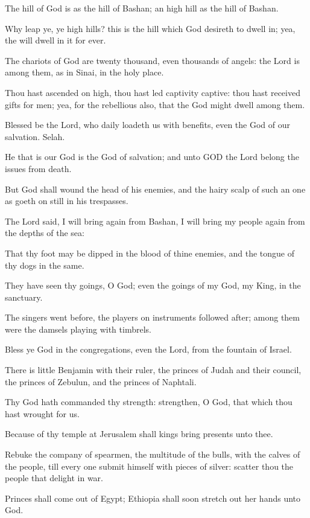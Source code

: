 \verse The hill of God is as the hill of Bashan; an high hill as the hill of Bashan.

\verse Why leap ye, ye high hills? this is the hill which God desireth to dwell in; yea, the \LORD will dwell in it for ever.

\verse The chariots of God are twenty thousand, even thousands of angels: the Lord is among them, as in Sinai, in the holy place.

\verse Thou hast ascended on high, thou hast led captivity captive: thou hast received gifts for men; yea, for the rebellious also, that the \LORD God might dwell among them.

\verse Blessed be the Lord, who daily loadeth us with benefits, even the God of our salvation. Selah.

\verse He that is our God is the God of salvation; and unto GOD the Lord belong the issues from death.

\verse But God shall wound the head of his enemies, and the hairy scalp of such an one as goeth on still in his trespasses.

\verse The Lord said, I will bring again from Bashan, I will bring my people again from the depths of the sea:

\verse That thy foot may be dipped in the blood of thine enemies, and the tongue of thy dogs in the same.

\verse They have seen thy goings, O God; even the goings of my God, my King, in the sanctuary.

\verse The singers went before, the players on instruments followed after; among them were the damsels playing with timbrels.

\verse Bless ye God in the congregations, even the Lord, from the fountain of Israel.

\verse There is little Benjamin with their ruler, the princes of Judah and their council, the princes of Zebulun, and the princes of Naphtali.

\verse Thy God hath commanded thy strength: strengthen, O God, that which thou hast wrought for us.

\verse Because of thy temple at Jerusalem shall kings bring presents unto thee.

\verse Rebuke the company of spearmen, the multitude of the bulls, with the calves of the people, till every one submit himself with pieces of silver: scatter thou the people that delight in war.

\verse Princes shall come out of Egypt; Ethiopia shall soon stretch out her hands unto God.

